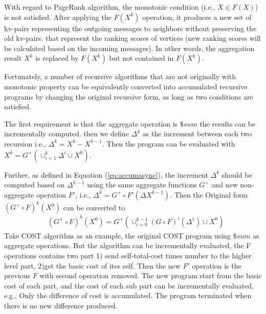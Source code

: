 With regard to PageRank algorithm, the monotonic condition (i.e., $X\in F(X)$) is not satisfied. After applying the $F(X^{k})$ operation, it produces a new set of kv-pairs representing the outgoing messages to neighbors  without preserving the old kv-pairs. {\color{green}that represent the ranking scores of vertices} (new ranking scores will be calculated based on the incoming messages). In other words, the aggregation result $X^{k}$ is replaced by $F(X^{k})$ but not contained in $F(X^{k})$.

Fortunately, a number of recursive algorithms that are not originally with monotonic property can be equivalently converted into accumulated recursive programs by changing the original recursive form, as long as two conditions are satisfied.


{\color{red}
	
	The first requirement is that{\color{blue} the aggregate operation is $\$sum$ } the results can be incrementally computed. then we define $\Delta^{k}$ as the increment between each two recursion i.e., $\Delta^{k}=X^k-X^{k-1}$. Then the program can be evaluated with $X^k=G^+(\cup_{i=1}^{k}\Delta^i\cup X^0)$.
	
	Further, as defined in Equation (\ref{eq:accumasync}), the increment $\Delta^{k}$ should be computed based on $\Delta^{k-1}$ using the same aggregate functions $G^+$ and new non-aggregate operation $F'$, i.e., $\Delta^{k}=G^+\circ F'(\Delta X^{k-1})$.
	Then the Original form $(G^+\circ F)^k(X^0)$ can be converted to
	\begin{equation}
	\label{eq:convertform}
	\begin{aligned}
	&(G^+\circ F)^k(X^0)
	=G^+( \cup_{i=0}^{k-1}{(G\circ F)^i(\Delta^{1})\cup X^0})
	\end{aligned}
	\end{equation}
Take COST algorithm as an example, the original COST program using $\$sum$ as aggregate operations. But the algorithm can be incrementally evaluated, the F operations contains two part 1) send self-total-cost times number to the higher level part, 2)get the basic cost of ites self.  Then the new $F'$ operation is the previous $F$ with second operation removed. The new program start from the basic cost of each part, and the cost of each sub part can be incrementally evaluated, e.g., Only the difference of cost is accumulated. The program terminated when there is no new difference produced.
	
}
